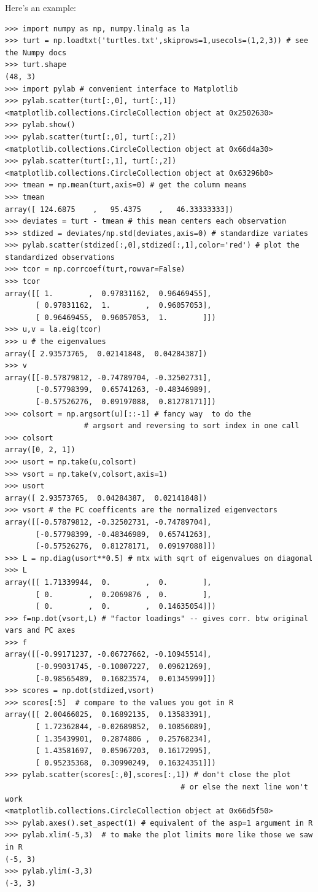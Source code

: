 Here's an example:

\begin{lstlisting}
>>> import numpy as np, numpy.linalg as la
>>> turt = np.loadtxt('turtles.txt',skiprows=1,usecols=(1,2,3)) # see the Numpy docs
>>> turt.shape
(48, 3)
>>> import pylab # convenient interface to Matplotlib
>>> pylab.scatter(turt[:,0], turt[:,1])
<matplotlib.collections.CircleCollection object at 0x2502630>
>>> pylab.show()
>>> pylab.scatter(turt[:,0], turt[:,2])
<matplotlib.collections.CircleCollection object at 0x66d4a30>
>>> pylab.scatter(turt[:,1], turt[:,2])
<matplotlib.collections.CircleCollection object at 0x63296b0>
>>> tmean = np.mean(turt,axis=0) # get the column means
>>> tmean
array([ 124.6875    ,   95.4375    ,   46.33333333])
>>> deviates = turt - tmean # this mean centers each observation
>>> stdized = deviates/np.std(deviates,axis=0) # standardize variates
>>> pylab.scatter(stdized[:,0],stdized[:,1],color='red') # plot the standardized observations
>>> tcor = np.corrcoef(turt,rowvar=False)
>>> tcor
array([[ 1.        ,  0.97831162,  0.96469455],
       [ 0.97831162,  1.        ,  0.96057053],
       [ 0.96469455,  0.96057053,  1.        ]])
>>> u,v = la.eig(tcor)
>>> u # the eigenvalues
array([ 2.93573765,  0.02141848,  0.04284387])
>>> v  
array([[-0.57879812, -0.74789704, -0.32502731],
       [-0.57798399,  0.65741263, -0.48346989],
       [-0.57526276,  0.09197088,  0.81278171]])
>>> colsort = np.argsort(u)[::-1] # fancy way  to do the 
                  # argsort and reversing to sort index in one call
>>> colsort
array([0, 2, 1])
>>> usort = np.take(u,colsort)
>>> vsort = np.take(v,colsort,axis=1)
>>> usort
array([ 2.93573765,  0.04284387,  0.02141848])
>>> vsort # the PC coefficents are the normalized eigenvectors
array([[-0.57879812, -0.32502731, -0.74789704],
       [-0.57798399, -0.48346989,  0.65741263],
       [-0.57526276,  0.81278171,  0.09197088]])
>>> L = np.diag(usort**0.5) # mtx with sqrt of eigenvalues on diagonal
>>> L
array([[ 1.71339944,  0.        ,  0.        ],
       [ 0.        ,  0.2069876 ,  0.        ],
       [ 0.        ,  0.        ,  0.14635054]])
>>> f=np.dot(vsort,L) # "factor loadings" -- gives corr. btw original vars and PC axes
>>> f
array([[-0.99171237, -0.06727662, -0.10945514],
       [-0.99031745, -0.10007227,  0.09621269],
       [-0.98565489,  0.16823574,  0.01345999]])
>>> scores = np.dot(stdized,vsort)
>>> scores[:5]  # compare to the values you got in R
array([[ 2.00466025,  0.16892135,  0.13583391],
       [ 1.72362844, -0.02689852,  0.10856089],
       [ 1.35439901,  0.2874806 ,  0.25768234],
       [ 1.43581697,  0.05967203,  0.16172995],
       [ 0.95235368,  0.30990249,  0.16324351]])
>>> pylab.scatter(scores[:,0],scores[:,1]) # don't close the plot 
                                        # or else the next line won't work
<matplotlib.collections.CircleCollection object at 0x66d5f50>
>>> pylab.axes().set_aspect(1) # equivalent of the asp=1 argument in R
>>> pylab.xlim(-5,3)  # to make the plot limits more like those we saw in R
(-5, 3)
>>> pylab.ylim(-3,3)
(-3, 3)
\end{lstlisting}
